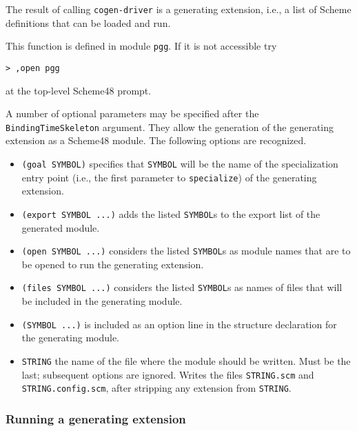 \documentclass[11pt]{article}
\makeatletter
\newcommand{\dindextt}[1]{\index{#1@\texttt{#1}|textbf}}
\makeatother
\begin{document}
The result of calling \texttt{cogen-driver} is a generating extension, i.e., a
list of Scheme definitions that can be loaded and run. 

This function is defined in module \texttt{pgg}. If it is not accessible try
\begin{verbatim}
> ,open pgg
\end{verbatim}
at the top-level Scheme48 prompt.

%
A number of optional parameters may be specified after the
\texttt{BindingTime\-Skeleton} argument. They allow the generation of the
generating extension as a Scheme48 module. The following options are
recognized.
\begin{itemize}
\item \texttt{(goal SYMBOL)} specifies that \texttt{SYMBOL} will be
  the name of the specialization entry point (i.e., the first
  parameter to \texttt{specialize}) of the generating extension.
\item \texttt{(export SYMBOL ...)} adds the listed \texttt{SYMBOL}s to the
  export list of the generated module.
\item \texttt{(open SYMBOL ...)} considers the listed \texttt{SYMBOL}s as
  module names that are to be opened to run the generating extension.
\item \texttt{(files SYMBOL ...)} considers the listed \texttt{SYMBOL}s as
  names of files that will be included in the generating module.
\item \texttt{(SYMBOL ...)} is included as an option line in the structure
  declaration for the generating module.
\item \texttt{STRING} the name of the file where the module should be
  written. Must be the last; subsequent options are ignored. Writes the files
  \texttt{STRING.scm} and \texttt{STRING.config.scm}, after stripping any
  extension from \texttt{STRING}.
\end{itemize}

\subsubsection{Running a generating extension}
\label{sec:specialize}
\dindextt{specialize}
\end{document}

